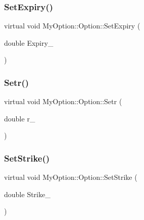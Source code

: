 \subsubsection{\texorpdfstring{Set\+Expiry()}{SetExpiry()}}
{\footnotesize\ttfamily virtual void My\+Option\+::\+Option\+::\+Set\+Expiry (\begin{DoxyParamCaption}\item[{double}]{Expiry\+\_\+ }\end{DoxyParamCaption})\hspace{0.3cm}{\ttfamily [virtual]}}

\hypertarget{classMyOption_1_1Option_ad39bb9124a47fc09e1962799f49e5367}{}\label{classMyOption_1_1Option_ad39bb9124a47fc09e1962799f49e5367} 
\subsubsection{\texorpdfstring{Setr()}{Setr()}}
{\footnotesize\ttfamily virtual void My\+Option\+::\+Option\+::\+Setr (\begin{DoxyParamCaption}\item[{double}]{r\+\_\+ }\end{DoxyParamCaption})\hspace{0.3cm}{\ttfamily [virtual]}}

\hypertarget{classMyOption_1_1Option_a66027e8726af31f88787412b605853db}{}\label{classMyOption_1_1Option_a66027e8726af31f88787412b605853db} 
\subsubsection{\texorpdfstring{Set\+Strike()}{SetStrike()}}
{\footnotesize\ttfamily virtual void My\+Option\+::\+Option\+::\+Set\+Strike (\begin{DoxyParamCaption}\item[{double}]{Strike\+\_\+ }\end{DoxyParamCaption})\hspace{0.3cm}{\ttfamily [virtual]}}

\hypertarget{classMyOption_1_1Option_a718b529588c5c949dccf71a28939ea25}{}\label{classMyOption_1_1Option_a718b529588c5c949dccf71a28939ea25} 
